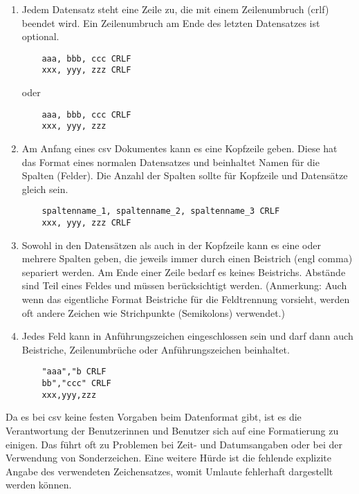 \begin{enumerate}{}
	
	\item Jedem Datensatz steht eine Zeile zu, die mit einem Zeilenumbruch (\ac{crlf}) beendet wird. Ein Zeilenumbruch am Ende des letzten Datensatzes ist optional. \zB 
	\begin{lstlisting}
	aaa, bbb, ccc CRLF
	xxx, yyy, zzz CRLF
	\end{lstlisting}
	oder
	\begin{lstlisting}
	aaa, bbb, ccc CRLF
	xxx, yyy, zzz
	\end{lstlisting}
	
	\item Am Anfang eines \acs{csv} Dokumentes kann es eine Kopfzeile geben. Diese hat das Format eines normalen Datensatzes und beinhaltet Namen für die Spalten (Felder). Die Anzahl der Spalten sollte für Kopfzeile und Datensätze gleich sein. \zB
	\begin{lstlisting}
	spaltenname_1, spaltenname_2, spaltenname_3 CRLF
	xxx, yyy, zzz CRLF
	\end{lstlisting} %
	
	\item Sowohl in den Datensätzen als auch in der Kopfzeile kann es eine oder mehrere Spalten geben, die jeweils immer durch einen Beistrich (\acs{engl} comma) separiert werden. Am Ende einer Zeile bedarf es keines Beistrichs. Abstände sind Teil eines Feldes und müssen berücksichtigt werden. (Anmerkung: Auch wenn das eigentliche Format Beistriche für die Feldtrennung vorsieht, werden oft andere Zeichen wie \zB Strichpunkte (Semikolons) verwendet.)
	
	\item Jedes Feld kann in Anführungszeichen eingeschlossen sein und darf dann auch Beistriche, Zeilenumbrüche oder Anführungszeichen beinhaltet. \zB
	\begin{lstlisting}
	"aaa","b CRLF
	bb","ccc" CRLF
	xxx,yyy,zzz
	\end{lstlisting}
	
\end{enumerate}

Da es bei \acs{csv} keine festen Vorgaben beim Datenformat gibt, ist es die Verantwortung der Benutzerinnen und Benutzer sich auf eine Formatierung zu einigen. Das führt oft zu Problemen bei Zeit- und Datumsangaben oder bei der Verwendung von Sonderzeichen. Eine weitere Hürde ist die fehlende explizite Angabe des verwendeten Zeichensatzes, womit \zB Umlaute fehlerhaft dargestellt werden können. \cite[vgl.][]{FuchsMediaSolutions:o.J.}

